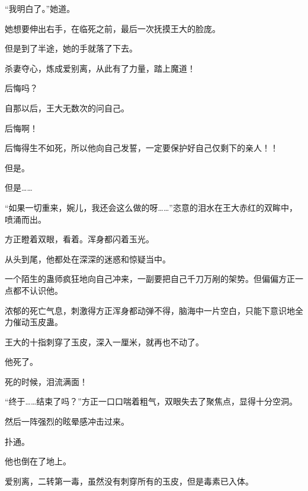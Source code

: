 \begin{this_body}
“我明白了。”她道。

她想要伸出右手，在临死之前，最后一次抚摸王大的脸庞。

但是到了半途，她的手就落了下去。

杀妻夺心，炼成爱别离，从此有了力量，踏上魔道！

后悔吗？

自那以后，王大无数次的问自己。

后悔啊！

后悔得生不如死，所以他向自己发誓，一定要保护好自己仅剩下的亲人！！

但是。

但是……

“如果一切重来，婉儿，我还会这么做的呀……”恣意的泪水在王大赤红的双眸中，喷涌而出。

方正瞪着双眼，看着。浑身都闪着玉光。

从头到尾，他都处在深深的迷惑和惊疑当中。

一个陌生的蛊师疯狂地向自己冲来，一副要把自己千刀万剐的架势。但偏偏方正一点都不认识他。

浓郁的死亡气息，刺激得方正浑身都动弹不得，脑海中一片空白，只能下意识地全力催动玉皮蛊。

王大的十指刺穿了玉皮，深入一厘米，就再也不动了。

他死了。

死的时候，泪流满面！

“终于……结束了吗？”方正一口口喘着粗气，双眼失去了聚焦点，显得十分空洞。

然后一阵强烈的眩晕感冲击过来。

扑通。

他也倒在了地上。

爱别离，二转第一毒，虽然没有刺穿所有的玉皮，但是毒素已入体。

\end{this_body}

